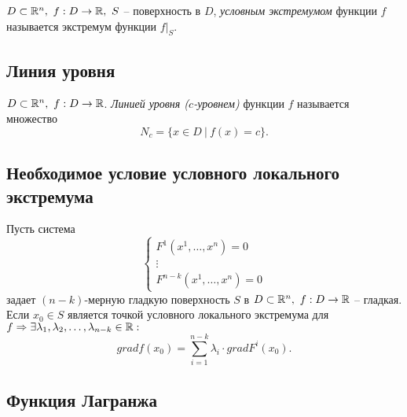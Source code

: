 \begin{definition}
    $ D \subset \R^n, \ f:D\rightarrow\R, \ S $ -- поверхность в $D$, \emph{условным экстремумом} функции $f$ называется экстремум функции $f\big|_S$.
\end{definition}

\subsection{Линия уровня}

\begin{definition}
    $D \subset \R^n, \ f:D\rightarrow\R$. \emph{Линией уровня ($c$-уровнем)} функции $f$ называется множество
    \[
        N_c = \big\{x\in D \ \big| \ f(x) = c\big\}.
    \]
\end{definition}

\subsection{Необходимое условие условного локального экстремума}

\begin{theorem}
    Пусть система 
    \begin{equation}\label{eq:20}
        \left\{\begin{array}{l}
            F^1(x^1,\ldots,x^n) = 0 \\
            \vdots                  \\
            F^{n-k}(x^1,\ldots,x^n) = 0
        \end{array}\right.
    \end{equation}
    задает $(n-k)$-мерную гладкую поверхность $S$ в $D \subset \R^n, \ f:D\rightarrow\R$ -- гладкая. Если $x_0 \in S$ является точкой условного локального экстремума для $f\Rightarrow \exists \lambda_1,\lambda_2,\ldots,\lambda_{n-k} \in \mathbb{R}:$
    \[
        grad f(x_0) = \sum_{i = 1}^{n-k}\lambda_i \cdot grad F^i(x_0).
    \]
\end{theorem}

\newpage

\subsection{Функция Лагранжа}

